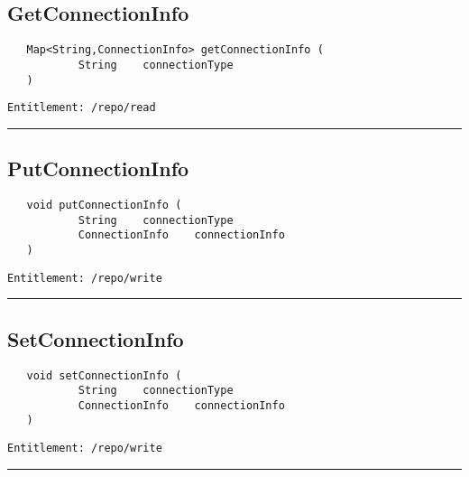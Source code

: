 \subsection{GetConnectionInfo}
\label{Api:GetConnectionInfo}
\begin{Verbatim}
   Map<String,ConnectionInfo> getConnectionInfo (
           String    connectionType
   )
\end{Verbatim}
\begin{Verbatim}[formatcom=\color{Maroon}]
  Entitlement: /repo/read
\end{Verbatim}



\rule{12cm}{2pt}
\subsection{PutConnectionInfo}
\label{Api:PutConnectionInfo}
\begin{Verbatim}
   void putConnectionInfo (
           String    connectionType
           ConnectionInfo    connectionInfo
   )
\end{Verbatim}
\begin{Verbatim}[formatcom=\color{Maroon}]
  Entitlement: /repo/write
\end{Verbatim}



\rule{12cm}{2pt}
\subsection{SetConnectionInfo}
\label{Api:SetConnectionInfo}
\begin{Verbatim}
   void setConnectionInfo (
           String    connectionType
           ConnectionInfo    connectionInfo
   )
\end{Verbatim}
\begin{Verbatim}[formatcom=\color{Maroon}]
  Entitlement: /repo/write
\end{Verbatim}



\rule{12cm}{2pt}
